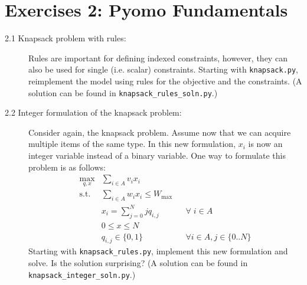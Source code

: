 \documentclass[12pt]{article}
\begin{document}
\section*{Exercises 2: Pyomo Fundamentals}
\begin{description}
\item [2.1 Knapsack problem with rules:] Rules are important for defining indexed constraints, however, they can also be used for single (i.e. scalar) constraints. Starting with {\tt knapsack.py}, reimplement the model using rules for the objective and the constraints. (A solution can be found in {\tt knapsack\_rules\_soln.py}.)
\item [2.2 Integer formulation of the knapsack problem:]
Consider again, the knapsack problem. Assume now that we can acquire multiple items of the same type. In this new formulation, $x_i$ is now an integer variable instead of a binary variable. One way to formulate this problem is as follows:
\begin{align*}
  \max_{q,x} &\sum_{i \in A} v_i x_i &&\\
  \mbox{s.t.} &\sum_{i \in A} w_i x_i \le W_{\mbox{max}} && \\
  &x_i = \sum_{j=0}^N j q_{i,j} && \forall \; i \in A \\
  &0 \le x \le N && \\
  &q_{i,j} \in \{0,1\} && \forall i \in A, j \in \{0..N\}
\end{align*}
Starting with {\tt knapsack\_rules.py}, implement this new formulation and solve. Is the solution surprising? (A solution can be found in {\tt knapsack\_integer\_soln.py}.)
\end{description}

\newpage
\end{document}
